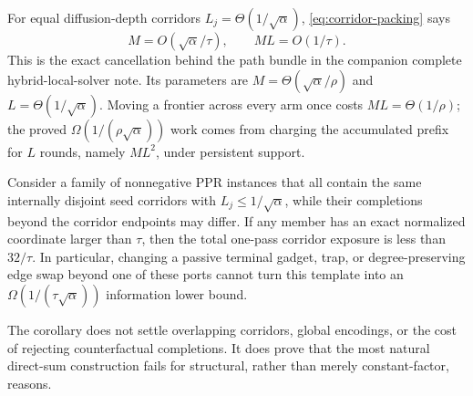 For equal diffusion-depth corridors $L_j=\Theta(1/\sqrt\alpha)$,
\cref{eq:corridor-packing} says
\begin{equation}
 M=O(\sqrt\alpha/\tau),
 \qquad
 ML=O(1/\tau).
 \label{eq:diffusion-cancellation}
\end{equation}
This is the exact cancellation behind the path bundle in the companion
complete hybrid-local-solver note.  Its parameters are
$M=\Theta(\sqrt\alpha/\rho)$ and
$L=\Theta(1/\sqrt\alpha)$.  Moving a frontier across every arm once costs
$ML=\Theta(1/\rho)$; the proved
$\Omega(1/(\rho\sqrt\alpha))$ work comes from charging the accumulated
prefix for $L$ rounds, namely $ML^2$, under persistent support.

\begin{corollary}
\label{cor:hidden-ports}
Consider a family of nonnegative PPR instances that all contain the same
internally disjoint seed corridors with $L_j\leq1/\sqrt\alpha$, while their
completions beyond the corridor endpoints may differ.  If any member has an
exact normalized coordinate larger than $\tau$, then the total one-pass
corridor exposure is less than $32/\tau$.  In particular, changing a passive
terminal gadget, trap, or degree-preserving edge swap beyond one of these
ports cannot turn this template into an
$\Omega(1/(\tau\sqrt\alpha))$ information lower bound.
\end{corollary}

The corollary does not settle overlapping corridors, global encodings, or the
cost of rejecting counterfactual completions.  It does prove that the most
natural direct-sum construction fails for structural, rather than merely
constant-factor, reasons.
